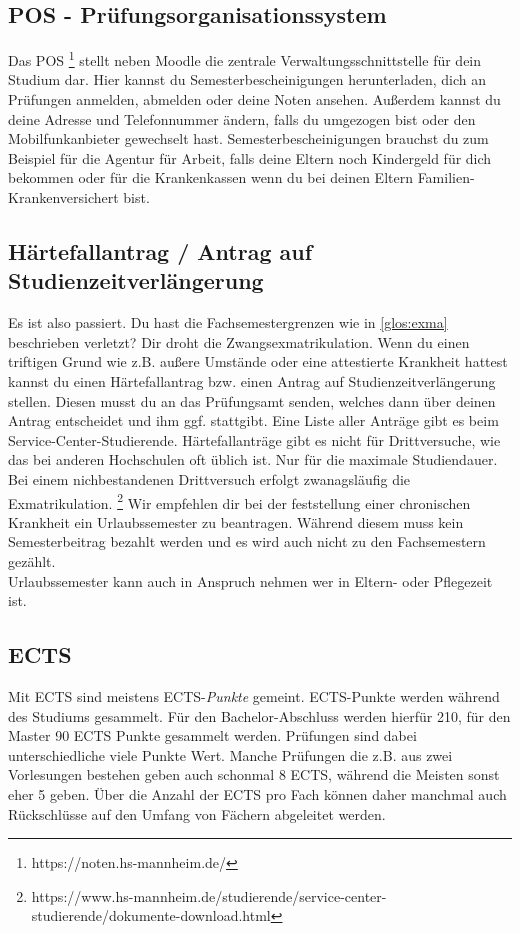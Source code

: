 \subsection*{POS - Prüfungsorganisationssystem}
Das POS \footnote{https://noten.hs-mannheim.de/} stellt neben Moodle die zentrale Verwaltungsschnittstelle für dein Studium dar.
Hier kannst du Semesterbescheinigungen herunterladen, dich an Prüfungen anmelden, abmelden oder deine Noten ansehen.
Außerdem kannst du deine Adresse und Telefonnummer ändern, falls du umgezogen bist oder den Mobilfunkanbieter gewechselt hast.
Semesterbescheinigungen brauchst du zum Beispiel für die Agentur für Arbeit, falls deine Eltern noch Kindergeld für dich bekommen oder für die Krankenkassen wenn du bei deinen Eltern Familien-Krankenversichert bist.

\subsection*{Härtefallantrag / Antrag auf Studienzeitverlängerung}
Es ist also passiert. Du hast die Fachsemestergrenzen wie in \ref*{glos:exma} beschrieben verletzt? Dir droht die Zwangsexmatrikulation.
Wenn du einen triftigen Grund wie z.B. außere Umstände oder  eine attestierte Krankheit hattest kannst du einen Härtefallantrag bzw. einen Antrag auf Studienzeitverlängerung stellen.
Diesen musst du an das Prüfungsamt senden, welches dann über deinen Antrag entscheidet und ihm ggf. stattgibt.
Eine Liste aller Anträge gibt es beim Service-Center-Studierende.
Härtefallanträge gibt es nicht für Drittversuche, wie das bei anderen Hochschulen oft üblich ist.
Nur für die maximale Studiendauer.
Bei einem nichbestandenen Drittversuch erfolgt zwanagsläufig die Exmatrikulation.
\footnote{https://www.hs-mannheim.de/studierende/service-center-studierende/dokumente-download.html}
Wir empfehlen dir bei der feststellung einer chronischen Krankheit ein Urlaubssemester zu beantragen.
Während diesem muss kein Semesterbeitrag bezahlt werden und es wird auch nicht zu den Fachsemestern gezählt.
\\
Urlaubssemester kann auch in Anspruch nehmen wer in Eltern- oder Pflegezeit ist.

\subsection*{ECTS}
Mit ECTS sind meistens ECTS-\textit{Punkte} gemeint.
ECTS-Punkte werden während des Studiums gesammelt.
Für den Bachelor-Abschluss werden hierfür 210, für den Master 90 ECTS Punkte gesammelt werden.
Prüfungen sind dabei unterschiedliche viele Punkte Wert.
Manche Prüfungen die z.B. aus zwei Vorlesungen bestehen geben auch schonmal 8 ECTS, während die Meisten sonst eher 5 geben.
Über die Anzahl der ECTS pro Fach können daher manchmal auch Rückschlüsse auf den Umfang von Fächern abgeleitet werden.

